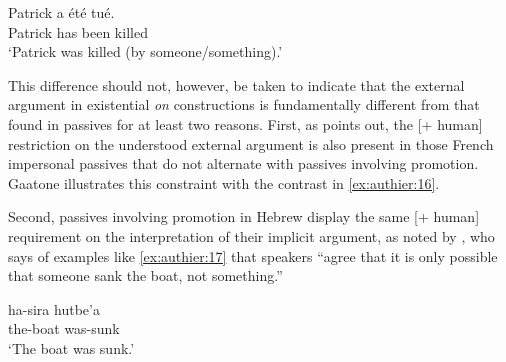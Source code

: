 \documentclass[output=paper,colorlinks,citecolor=brown]{langscibook}
\begin{document}
\begin{exe}
\ex\label{ex:authier:15} 
\gll Patrick a été tué.\\
Patrick has been killed\\
\glt `Patrick was killed (by someone/something).'
\end{exe}

This difference should not, however, be taken to indicate that the external argument in existential \textit{on} constructions is fundamentally different from that found in passives for at least two reasons. First, as \citet[43]{gaatone1994a} points out, the [+ human] restriction on the understood external argument is also present in those French impersonal passives that do not alternate with passives involving promotion. Gaatone illustrates this constraint with the contrast in \ref{ex:authier:16}.

\begin{exe}
\ex\label{ex:authier:16} 
\begin{xlist} %

\end{xlist}
\end{exe}


Second, passives involving promotion in Hebrew display the same [+ human] requirement on the interpretation of their implicit argument, as noted by \citet{meltzer-asscher2012a}, who says of examples like \ref{ex:authier:17} that speakers “agree that it is only possible that someone sank the boat, not something.”

\begin{exe}
\ex\label{ex:authier:17} 
\gll ha-sira hutbe’a \\
the-boat was-sunk\\
\glt `The boat was sunk.'\\
\end{exe}
\end{document}
